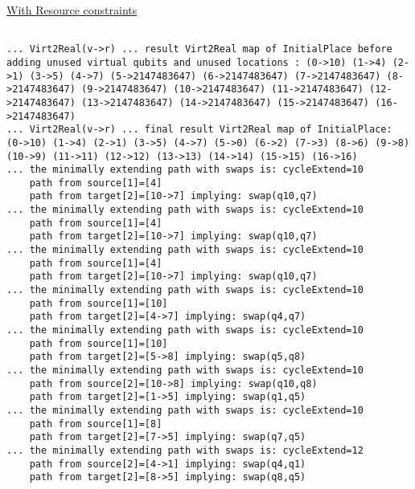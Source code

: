 \documentclass[11pt]{article}
\begin{document}
\begin{minipage}[t]{.45\textwidth}

\uline{With Resource constraints}

\begin{verbatim}

... Virt2Real(v->r) ... result Virt2Real map of InitialPlace before adding unused virtual qubits and unused locations : (0->10) (1->4) (2->1) (3->5) (4->7) (5->2147483647) (6->2147483647) (7->2147483647) (8->2147483647) (9->2147483647) (10->2147483647) (11->2147483647) (12->2147483647) (13->2147483647) (14->2147483647) (15->2147483647) (16->2147483647)
... Virt2Real(v->r) ... final result Virt2Real map of InitialPlace: (0->10) (1->4) (2->1) (3->5) (4->7) (5->0) (6->2) (7->3) (8->6) (9->8) (10->9) (11->11) (12->12) (13->13) (14->14) (15->15) (16->16)
... the minimally extending path with swaps is: cycleExtend=10
	path from source[1]=[4]
	path from target[2]=[10->7] implying: swap(q10,q7)
... the minimally extending path with swaps is: cycleExtend=10
	path from source[1]=[4]
	path from target[2]=[10->7] implying: swap(q10,q7)
... the minimally extending path with swaps is: cycleExtend=10
	path from source[1]=[4]
	path from target[2]=[10->7] implying: swap(q10,q7)
... the minimally extending path with swaps is: cycleExtend=10
	path from source[1]=[10]
	path from target[2]=[4->7] implying: swap(q4,q7)
... the minimally extending path with swaps is: cycleExtend=10
	path from source[1]=[10]
	path from target[2]=[5->8] implying: swap(q5,q8)
... the minimally extending path with swaps is: cycleExtend=10
	path from source[2]=[10->8] implying: swap(q10,q8)
	path from target[2]=[1->5] implying: swap(q1,q5)
... the minimally extending path with swaps is: cycleExtend=10
	path from source[1]=[8]
	path from target[2]=[7->5] implying: swap(q7,q5)
... the minimally extending path with swaps is: cycleExtend=12
	path from source[2]=[4->1] implying: swap(q4,q1)
	path from target[2]=[8->5] implying: swap(q8,q5)
\end{verbatim}

\end{minipage}
\hfill %
\end{document}
